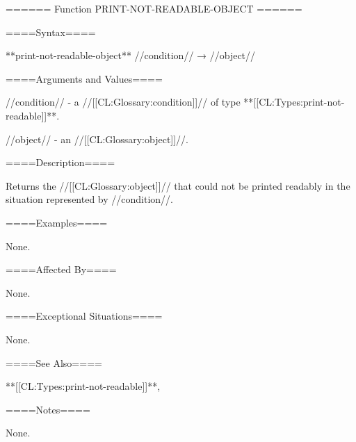 ====== Function PRINT-NOT-READABLE-OBJECT ======

====Syntax====

**print-not-readable-object** //condition// → //object//

====Arguments and Values====

//condition// - a //[[CL:Glossary:condition]]// of type **[[CL:Types:print-not-readable]]**.

//object// - an //[[CL:Glossary:object]]//.

====Description====

Returns the //[[CL:Glossary:object]]// that could not be printed readably in the situation represented by //condition//.

====Examples====

None.

====Affected By====

None.

====Exceptional Situations====

None.

====See Also====

**[[CL:Types:print-not-readable]]**,{\secref\Conditions}

====Notes====

None.

